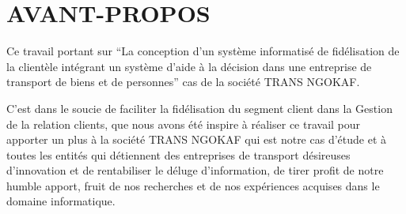 \chapter*{AVANT-PROPOS}
Ce travail portant sur \enquote{La conception d’un système informatisé de fidélisation
de la clientèle intégrant un système d’aide à la décision dans une entreprise de transport
de biens et de personnes} cas de la société TRANS NGOKAF.
\newline

C’est dans le soucie de faciliter la fidélisation du segment client
dans la Gestion de la relation clients, que nous avons été inspire
à réaliser ce travail pour apporter un plus à la société TRANS NGOKAF
qui est notre cas d’étude et à toutes les entités qui détiennent des entreprises
de transport désireuses d’innovation et de rentabiliser le 
déluge d’information, de tirer profit de notre humble apport, fruit
de nos recherches et de nos expériences acquises dans le domaine informatique.